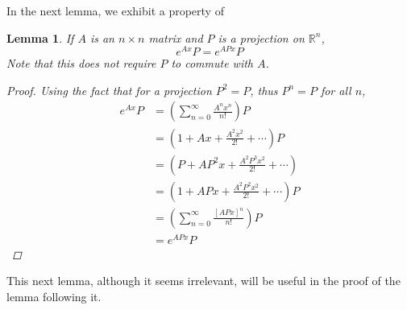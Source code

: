\documentclass[12pt]{article}
\def\R{{\mathbb R}}
\newtheorem{lemma}{Lemma}
\begin{document}
In the next lemma, we exhibit a property of 

\begin{lemma}\label{expproj}
If $A$ is an $n \times n$ matrix and $P$ is a projection on $\R^n$, 
\[
e^{Ax} P = e^{APx} P 
\]
Note that this does not require $P$ to commute with $A$.
\begin{proof} 
Using the fact that for a projection $P^2 = P$, thus $P^n = P$ for all $n$,
\begin{align*}
e^{Ax} P &= \left( \sum_{n = 0}^\infty \frac{ A^n x^n }{n!} \right) P \\
&= \left(1 + Ax + \frac{A^2 x^2}{2!} + \cdots \right) P \\
&= \left(P + AP^2 x + \frac{A^2 P^3 x^2}{2!} + \cdots \right)\\
&= \left(1 + AP x + \frac{A^2 P^2 x^2}{2!} + \cdots \right) P \\
&= \left( \sum_{n = 0}^\infty \frac{ [ A P x]^n}{n!} \right) P \\
&= e^{AP x} P
\end{align*}
\end{proof}
\end{lemma}

This next lemma, although it seems irrelevant, will be useful in the proof of the lemma following it.
\end{document}
